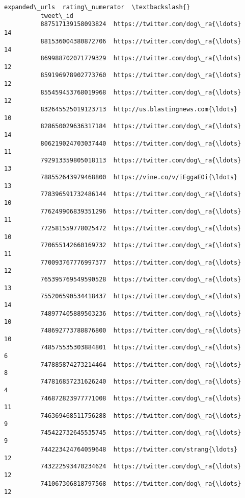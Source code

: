 \documentclass[11pt]{article}
\begin{document}
\begin{Verbatim}[commandchars=\\\{\}]
                                              expanded\_urls  rating\_numerator  \textbackslash{}
          tweet\_id                                                              
          887517139158093824  https://twitter.com/dog\_ra{\ldots}                14   
          881536004380872706  https://twitter.com/dog\_ra{\ldots}                14   
          869988702071779329  https://twitter.com/dog\_ra{\ldots}                12   
          859196978902773760  https://twitter.com/dog\_ra{\ldots}                12   
          855459453768019968  https://twitter.com/dog\_ra{\ldots}                12   
          832645525019123713  http://us.blastingnews.com{\ldots}                10   
          828650029636317184  https://twitter.com/dog\_ra{\ldots}                14   
          806219024703037440  https://twitter.com/dog\_ra{\ldots}                11   
          792913359805018113  https://twitter.com/dog\_ra{\ldots}                13   
          788552643979468800  https://vine.co/v/iEggaEOi{\ldots}                13   
          778396591732486144  https://twitter.com/dog\_ra{\ldots}                10   
          776249906839351296  https://twitter.com/dog\_ra{\ldots}                11   
          772581559778025472  https://twitter.com/dog\_ra{\ldots}                10   
          770655142660169732  https://twitter.com/dog\_ra{\ldots}                11   
          770093767776997377  https://twitter.com/dog\_ra{\ldots}                12   
          765395769549590528  https://twitter.com/dog\_ra{\ldots}                13   
          755206590534418437  https://twitter.com/dog\_ra{\ldots}                14   
          748977405889503236  https://twitter.com/dog\_ra{\ldots}                10   
          748692773788876800  https://twitter.com/dog\_ra{\ldots}                10   
          748575535303884801  https://twitter.com/dog\_ra{\ldots}                 6   
          747885874273214464  https://twitter.com/dog\_ra{\ldots}                 8   
          747816857231626240  https://twitter.com/dog\_ra{\ldots}                 4   
          746872823977771008  https://twitter.com/dog\_ra{\ldots}                11   
          746369468511756288  https://twitter.com/dog\_ra{\ldots}                 9   
          745422732645535745  https://twitter.com/dog\_ra{\ldots}                 9   
          744223424764059648  https://twitter.com/strang{\ldots}                12   
          743222593470234624  https://twitter.com/dog\_ra{\ldots}                12   
          741067306818797568  https://twitter.com/dog\_ra{\ldots}                12   

\end{Verbatim}
\end{document}
